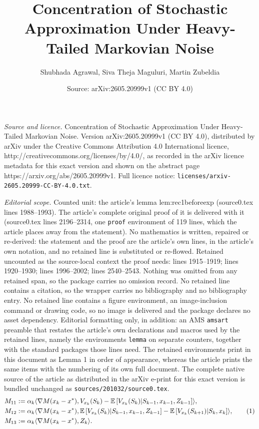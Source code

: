 \documentclass[10pt,a4paper]{amsart}
\title{Concentration of Stochastic Approximation Under Heavy-Tailed Markovian Noise}
\author{Shubhada Agrawal, Siva Theja Maguluri, Martin Zubeldia}
\date{Source: arXiv:2605.20999v1 (CC BY 4.0)}
\newcommand{\E}[1]{\mathbb{E}\lrs{#1}}
\newcommand{\lrs}[1]{\left[ #1 \right]}
\newcommand{\numberthis}{\addtocounter{equation}{1}\tag{\theequation}}
\newcommand{\xk}{x_k}
\begin{document}
\maketitle

\noindent\emph{Source and licence.} Concentration of Stochastic Approximation Under Heavy-Tailed Markovian Noise. Version arXiv:2605.20999v1 (CC BY 4.0), distributed by arXiv under the Creative Commons Attribution 4.0 International licence, http://creativecommons.org/licenses/by/4.0/, as recorded in the arXiv licence metadata for this exact version and shown on the abstract page https://arxiv.org/abs/2605.20999v1. Full licence notice: \texttt{licenses/arxiv-2605.20999-CC-BY-4.0.txt}.\par\smallskip

\noindent\textit{Editorial scope.} Counted unit: the article's lemma lem:rec1beforeexp (source0.tex lines 1988--1993). The article's complete original proof of it is delivered with it (source0.tex lines 2196--2314, one \texttt{proof} environment of 119 lines, which the article places away from the statement). No mathematics is written, repaired or re-derived: the statement and the proof are the article's own lines, in the article's own notation, and no retained line is substituted or re-flowed.  Retained uncounted as the source-local context the proof needs: lines 1915--1919; lines 1920--1930; lines 1996--2002; lines 2540--2543.  Nothing was omitted from any retained span, so the package carries no omission record.  No retained line contains a citation, so the wrapper carries no bibliography and no bibliography entry.  No retained line contains a figure environment, an image-inclusion command or drawing code, so no image is delivered and the package declares no asset dependency.  Editorial formatting only, in addition: an AMS \texttt{amsart} preamble that restates the article's own declarations and macros used by the retained lines, namely the environments \texttt{lemma} on separate counters, together with the standard packages those lines need.  The retained environments print in this document as Lemma 1 in order of appearance, whereas the article prints the same items with the numbering of its own full document.  The complete native source of the article as distributed in the arXiv e-print for this exact version is bundled unchanged as \texttt{sources/201032/source0.tex}.
    \begin{align*}
        &M_{11} := \alpha_k \langle \nabla M(\xk - x^*), V_{x_k}(S_k) - \E{V_{x_k}(S_k) | S_{k-1}, x_{k-1}, Z_{k-1}} \rangle, \\
        & M_{12} := \alpha_k \langle \nabla M(\xk - x^*), \E{V_{x_k}(S_k) | S_{k-1}, x_{k-1}, Z_{k-1}} - \E{V_{x_k}(S_{k+1}) | S_{k}, x_{k}} \rangle, \numberthis \label{eq:T12}\\
        & M_{13} := \alpha_k \langle \nabla M(\xk - x^*), Z_k \rangle.
    \end{align*}
\end{document}
